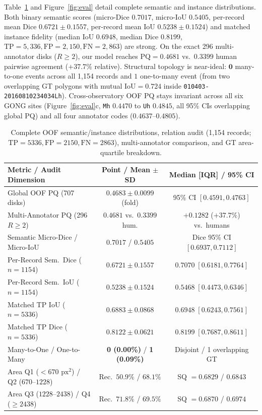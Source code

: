 \documentclass[sigconf]{acmart}
\begin{document}
Table~\ref{tab:dist} and Figure~\ref{fig:eval} detail complete semantic and instance distributions. Both binary semantic scores (micro-Dice $0.7017$, micro-IoU $0.5405$, per-record mean Dice $0.6721\pm 0.1557$, per-record mean IoU $0.5238\pm 0.1524$) and matched instance fidelity (median IoU $0.6948$, median Dice $0.8199$, $\mathrm{TP}{=}5{,}336, \mathrm{FP}{=}2{,}150, \mathrm{FN}{=}2{,}863$) are strong. On the exact 296 multi-annotator disks ($R{\ge}2$), our model reaches $\mathrm{PQ}=0.4681$ vs.\ $0.3399$ human pairwise agreement ($+37.7\%$ relative). Structural topology is near-ideal: $\mathbf{0}$ many-to-one events across all 1,154 records and $1$ one-to-many event (from two overlapping GT polygons with mutual $\mathrm{IoU}=0.724$ inside \texttt{010403-20160810234034Lh}). Cross-observatory OOF PQ stays invariant across all six GONG sites (Figure~\ref{fig:eval}c, \texttt{Mh} $0.4470$ to \texttt{Uh} $0.4845$, all 95\% CIs overlapping global PQ) and all four annotator codes ($0.4637\text{--}0.4805$).

\begin{table}[t]
\centering
\caption{Complete OOF semantic/instance distributions, relation audit (1,154 records; $\mathrm{TP}{=}5336, \mathrm{FP}{=}2150, \mathrm{FN}{=}2863$), multi-annotator comparison, and GT area-quartile breakdown.}
\label{tab:dist}
\scriptsize
\setlength{\tabcolsep}{2.6pt}
\begin{tabular}{@{}lcc@{}}
\toprule
\textbf{Metric / Audit Dimension} & \textbf{Point / Mean $\pm$ SD} & \textbf{Median [IQR] / 95\% CI} \\
\midrule
Global OOF PQ (707 disks) & $0.4683 \pm 0.0099$ (fold) & 95\% CI $[0.4591, 0.4763]$ \\
Multi-Annotator PQ (296 $R{\ge}2$) & $\mathbf{0.4681}$ vs.\ $0.3399$ hum. & $+0.1282$ ($+37.7\%$) vs.\ humans \\
Semantic Micro-Dice / Micro-IoU & $0.7017$ / $0.5405$ & Dice 95\% CI $[0.6937, 0.7112]$ \\
Per-Record Sem.\ Dice ($n{=}1154$) & $0.6721 \pm 0.1557$ & $0.7070\; [0.6181, 0.7764]$ \\
Per-Record Sem.\ IoU ($n{=}1154$) & $0.5238 \pm 0.1524$ & $0.5468\; [0.4473, 0.6346]$ \\
Matched TP IoU ($n{=}5336$) & $0.6883 \pm 0.0868$ & $0.6948\; [0.6243, 0.7561]$ \\
Matched TP Dice ($n{=}5336$) & $0.8122 \pm 0.0621$ & $0.8199\; [0.7687, 0.8611]$ \\
\midrule
Many-to-One / One-to-Many & \textbf{0 (0.00\%)} / \textbf{1 (0.09\%)} & Disjoint / 1 overlapping GT \\
\midrule
Area Q1 ($<670\text{ px}^2$) / Q2 ($670\text{--}1228$) & Rec.\ $50.9\%$ / $68.1\%$ & SQ $= 0.6829$ / $0.6843$ \\
Area Q3 ($1228\text{--}2438$) / Q4 ($\ge 2438$) & Rec.\ $71.8\%$ / $69.5\%$ & SQ $= 0.6870$ / $0.6974$ \\
\bottomrule
\end{tabular}
\end{table}
\end{document}
